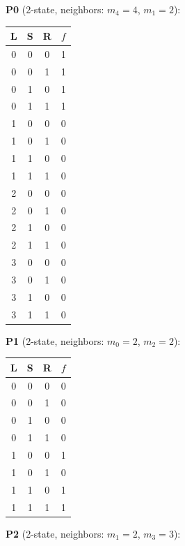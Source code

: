 \documentclass[11pt]{article}
\begin{document}
\noindent\textbf{P0} (2-state, neighbors: $m_4=4$, $m_1=2$):

\begin{center}
\begin{tabular}{cccc}
\toprule
L & S & R & $f$ \\
\midrule
0 & 0 & 0 & 1 \\
0 & 0 & 1 & 1 \\
0 & 1 & 0 & 1 \\
0 & 1 & 1 & 1 \\
1 & 0 & 0 & 0 \\
1 & 0 & 1 & 0 \\
1 & 1 & 0 & 0 \\
1 & 1 & 1 & 0 \\
2 & 0 & 0 & 0 \\
2 & 0 & 1 & 0 \\
2 & 1 & 0 & 0 \\
2 & 1 & 1 & 0 \\
3 & 0 & 0 & 0 \\
3 & 0 & 1 & 0 \\
3 & 1 & 0 & 0 \\
3 & 1 & 1 & 0 \\
\bottomrule
\end{tabular}
\end{center}

\noindent\textbf{P1} (2-state, neighbors: $m_0=2$, $m_2=2$):

\begin{center}
\begin{tabular}{cccc}
\toprule
L & S & R & $f$ \\
\midrule
0 & 0 & 0 & 0 \\
0 & 0 & 1 & 0 \\
0 & 1 & 0 & 0 \\
0 & 1 & 1 & 0 \\
1 & 0 & 0 & 1 \\
1 & 0 & 1 & 0 \\
1 & 1 & 0 & 1 \\
1 & 1 & 1 & 1 \\
\bottomrule
\end{tabular}
\end{center}

\noindent\textbf{P2} (2-state, neighbors: $m_1=2$, $m_3=3$):
\end{document}
